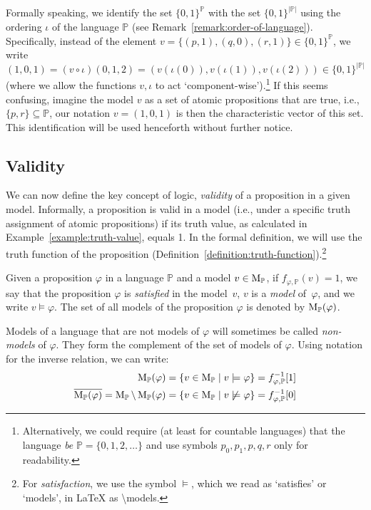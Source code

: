 \begin{remark}
Formally speaking, we identify the set $\{0,1\}^\mathbb{P}$ with the set $\{0,1\}^{|\mathbb{P}|}$ using the ordering $\iota$ of the language $\mathbb{P}$ (see Remark~\ref{remark:order-of-language}). Specifically, instead of the element $v = \{(p,1),(q,0),(r,1)\} \in \{0,1\}^\mathbb{P}$, we write $(1,0,1) = (v \circ \iota)(0,1,2) = (v(\iota(0)),v(\iota(1)),v(\iota(2))) \in \{0,1\}^{|\mathbb{P}|}$ (where we allow the functions $v,\iota$ to act `component-wise').\footnote{Alternatively, we could require (at least for countable languages) that the language \emph{be} $\mathbb{P} = \{0,1,2,\dots\}$ and use symbols $p_0,p_1,p,q,r$ only for readability.} If this seems confusing, imagine the model $v$ as a set of atomic propositions that are true, i.e., $\{p,r\} \subseteq \mathbb{P}$, our notation $v = (1,0,1)$ is then the characteristic vector of this set. This identification will be used henceforth without further notice. 
\end{remark}






\subsection{Validity}

We can now define the key concept of logic, \emph{validity} of a proposition in a given model. Informally, a proposition is valid in a model (i.e., under a specific truth assignment of atomic propositions) if its truth value, as calculated in Example~\ref{example:truth-value}, equals 1. In the formal definition, we will use the truth function of the proposition (Definition~\ref{definition:truth-function}).\footnote{For \emph{satisfaction}, we use the symbol $\models$, which we read as `satisfies' or `models', in {\LaTeX} as {\textbackslash}models.}

\begin{definition}\label{definition:validity}
    Given a proposition $\varphi$ in a language $\mathbb{P}$ and a model $v \in \operatorname{M}_\mathbb{P}$, if $f_{\varphi,\mathbb{P}}(v) = 1$, we say that the proposition $\varphi$ is \emph{satisfied} in the model~$v$, $v$ is a \emph{model} of~$\varphi$, and we write $v \models \varphi$. The set of all models of the proposition $\varphi$ is denoted by $\operatorname{M}_\mathbb{P}(\varphi)$.
\end{definition}
Models of a language that are not models of $\varphi$ will sometimes be called \emph{non-models} of $\varphi$. They form the complement of the set of models of $\varphi$. Using notation for the inverse relation, we can write:
\begin{align*}
    \operatorname{M}_\mathbb{P}(\varphi) &= \{v \in \operatorname{M}_\mathbb{P} \mid v \models \varphi\} = f_{\varphi,\mathbb{P}}^{-1}[1]\\
    \overline{\operatorname{M}_\mathbb{P}(\varphi)} = \operatorname{M}_\mathbb{P} \setminus \operatorname{M}_\mathbb{P}(\varphi) &= \{v \in \operatorname{M}_\mathbb{P} \mid v \not\models \varphi\} = f_{\varphi,\mathbb{P}}^{-1}[0]
\end{align*}

